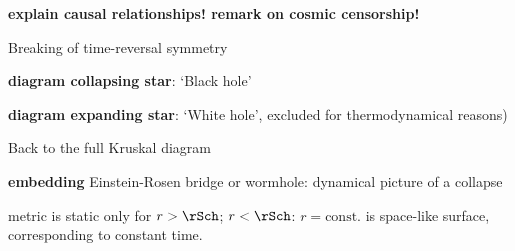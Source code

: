\textbf{explain causal relationships! remark on cosmic censorship!}


\begin{nameddef}{Breaking of time-reversal symmetry}

\textbf{diagram collapsing star}: `Black hole'

\textbf{diagram expanding star}: `White hole', excluded for
thermodynamical reasons)

\end{nameddef}

\begin{nameddef}{Back to the full Kruskal diagram}

\textbf{embedding} Einstein-Rosen bridge or wormhole: dynamical picture of
a collapse
\cite{flamm1916beitraege,PhysRev.48.73}

metric is static only for $r > \rSch$; $r < \rSch$: $r = \text{const.}$ is
space-like surface, corresponding to constant time.
\end{nameddef}

